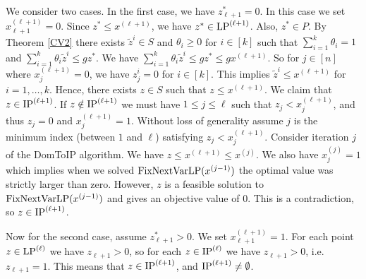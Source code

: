 We consider two cases. In the first case, we have $z^*_{\ell+1}=0$. In this case we set $x^{(\ell+1)}_{\ell+1}=0$. Since $z^*\leq x^{(\ell+1)}$, we have $z^*\in \operatorname{LP}^{(\ell+1)}$. Also, $z^*\in P$. By Theorem \ref{CV2} there exists $\tilde{z}^i\in S$ and $\theta_i\geq 0$ for $i\in [k]$ such that $\sum_{i=1}^{k} \theta_i = 1$ and  $\sum_{i=1}^{k}\theta_i \tilde{z}^i \leq gz^*$. We have $\sum_{i=1}^{k}\theta_i \tilde{z}^i \leq gz^*\leq gx^{(\ell+1)}$.
So for $j\in [n]$ where $x^{(\ell+1)}_j=0$, we have $z^i_j=0$ for $i\in [k]$. This implies $\tilde{z}^i\leq x^{(\ell+1)}$ for $i=1,\ldots,k$. Hence, there exists $z\in S$ such that $z\leq x^{(\ell+1)}$. We claim that $z\in \operatorname{IP}^{(\ell+1)}$. If $z\notin \operatorname{IP}^{(\ell+1)}$ we must have $1\leq j \leq \ell$ such that $z_j < x^{(\ell+1)}_{j}$, and thus $z_j = 0$ and $x^{(\ell+1)}_j=1$. Without loss of generality assume $j$ is the minimum index (between $1$ and $\ell$) satisfying $z_j < x^{(\ell+1)}_{j}$. Consider iteration $j$ of the DomToIP algorithm. We have $z\leq x^{(\ell+1)}\leq x^{(j)}$.
We also have $x^{(j)}_j=1$ which implies when we solved $\operatorname{{{FixNextVarLP}}}(x^{(j-1)})$ the optimal value was strictly larger than zero. However, $z$ is a feasible solution to $\operatorname{{{FixNextVarLP}}}(x^{(j-1)})$ and gives an objective value of 0. This is a contradiction, so $z\in \operatorname{IP}^{(\ell+1)}$.

Now for the second case, assume $z^*_{\ell+1} > 0$. We set $x^{(\ell+1)}_{\ell+1}=1$. For each point $z\in \operatorname{LP}^{(\ell)}$ we have $z_{\ell+1} >0$, so for each $z\in \operatorname{IP}^{(\ell)}$ we have $z_{\ell+1}>0$, i.e. $z_{\ell+1}=1$. This means that $z\in \operatorname{IP}^{(\ell+1)}$, and $\operatorname{IP}^{(\ell+1)} \neq \emptyset$.

